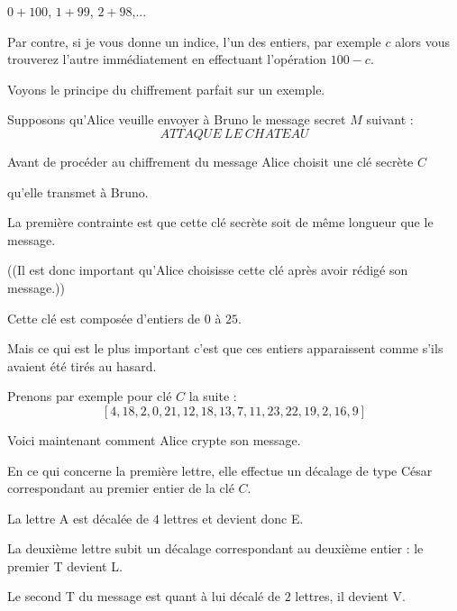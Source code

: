 \change

$0+100$, $1+99$, $2+98$,...


\change

Par contre, si je vous donne un indice, l'un des entiers, par exemple $c$ alors vous trouverez l'autre immédiatement en effectuant l'opération $100-c$.


\diapo

Voyons le principe du chiffrement parfait sur un exemple.


Supposons qu'Alice veuille envoyer à Bruno le message secret $M$ suivant : 
$${ATTAQUE \ LE \ CHATEAU}$$


\change

Avant de procéder au chiffrement du message Alice choisit une clé secrète $C$ 

\change

qu'elle transmet à Bruno.

\change

La première contrainte est que cette clé secrète soit de même longueur que le message.

((Il est donc important qu'Alice choisisse cette clé après avoir rédigé son message.))

\change

Cette clé est composée d'entiers de $0$ à $25$. 

Mais ce qui est le plus important c'est que ces entiers apparaissent comme s'ils avaient été tirés au hasard. 

\change

Prenons par exemple pour clé $C$ la suite : 
$${[4, 18, 2, 0, 21, 12, 18, 13, 7, 11, 23, 22, 19, 2, 16, 9]}$$


\change

Voici maintenant comment Alice crypte son message.

En ce qui concerne la première lettre, elle effectue un décalage de type César correspondant au premier entier de la clé $C$.

La lettre A est décalée de $4$ lettres et devient donc E.

\change

La deuxième lettre subit un décalage correspondant au deuxième entier : le premier T devient L.

\change

Le second T du message est quant à lui décalé de $2$ lettres, il devient V. 

\change

